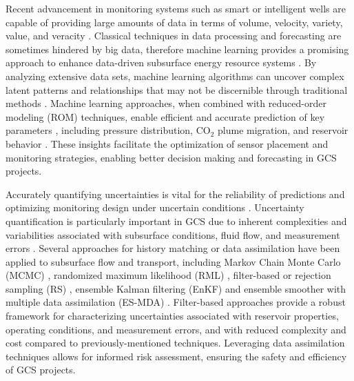\documentclass[10pt, twoside]{article}
\begin{document}
Recent advancement in monitoring systems such as smart or intelligent wells are capable of providing large amounts of data in terms of volume, velocity, variety, value, and veracity \citep{2021AGUFM.H25O1207S, tariq2021systematic, MIRZA202227}. Classical techniques in data processing and forecasting are sometimes hindered by big data, therefore machine learning provides a promising approach to enhance data-driven subsurface energy resource systems \citep{10.30632/SPWLA-2023-0084, pan2022, Laloy2018381, Liu2019725, Etienam2019}. By analyzing extensive data sets, machine learning algorithms can uncover complex latent patterns and relationships that may not be discernible through traditional methods \citep{Hassoun1995FundamentalsNetworks, Yegnanarayana2009ArtificialNetworks, Yeten2005, Chen2016, Babaei201619, Guo20182409, Ampomah201780, Wang2009506}. Machine learning approaches, when combined with reduced-order modeling (ROM) techniques, enable efficient and accurate prediction of key parameters \citep{Brunton2016SparseNLDynamics, FriesChoi2022LaSDI, HeChoi2023gLaSDI, Lucia2004Reduced-orderPhysics, Cardoso2009DevelopmentSimulationb, Zhu201956, Jin2020}, including pressure distribution, CO$_2$ plume migration, and reservoir behavior \citep{Wen2023Operators, Wen2021, Maldonado2021Unet, Razak2022, Kim2023}. These insights facilitate the optimization of sensor placement and monitoring strategies, enabling better decision making and forecasting in GCS projects.

Accurately quantifying uncertainties is vital for the reliability of predictions and optimizing monitoring design under uncertain conditions \citep{Zhu2018415, Wang2021, Mohamed201031, Chen2017328, Cremon2020, Bellenfant20092447, Sun2019, Li2011, Nordbotten2012234}. Uncertainty quantification is particularly important in GCS due to inherent complexities and variabilities associated with subsurface conditions, fluid flow, and measurement errors \citep{Jia2018104, Chen2020, Jeong20133771, Jayne2019128}. Several approaches for history matching or data assimilation have been applied to subsurface flow and transport, including Markov Chain Monte Carlo (MCMC) \citep{Emerick2012418, Liu2003188, Chen2016, Chen2017328, Cremon2020}, randomized maximum likelihood (RML) \citep{Chen20121}, filter-based or rejection sampling (RS) \citep{bhark2014assisted, park2013history, ma2008efficient, Caers2011}, ensemble Kalman filtering (EnKF) \citep{Chen2010579, Chang20108011, tavakoli2013comparison, dawuda2022geologic, Ma2019199} and ensemble smoother with multiple data assimilation (ES-MDA) \citep{Rafiee2017, Chen2020, jahandideh2021inference, tadjer2021managing, jiang2021data, liu20213d, misra2022deep}. Filter-based approaches provide a robust framework for characterizing uncertainties associated with reservoir properties, operating conditions, and measurement errors, and with reduced complexity and cost compared to previously-mentioned techniques. Leveraging data assimilation techniques allows for informed risk assessment, ensuring the safety and efficiency of GCS projects. 
\end{document}
